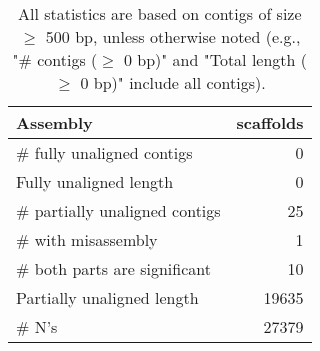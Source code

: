 \documentclass[12pt,a4paper]{article}
\begin{document}
\begin{table}[ht]
\begin{center}
\caption{All statistics are based on contigs of size $\geq$ 500 bp, unless otherwise noted (e.g., "\# contigs ($\geq$ 0 bp)" and "Total length ($\geq$ 0 bp)" include all contigs).}
\begin{tabular}{|l*{1}{|r}|}
\hline
Assembly & scaffolds \\ \hline
\# fully unaligned contigs & 0 \\ \hline
Fully unaligned length & 0 \\ \hline
\# partially unaligned contigs & 25 \\ \hline
\hspace{5mm}\# with misassembly & 1 \\ \hline
\hspace{5mm}\# both parts are significant & 10 \\ \hline
Partially unaligned length & 19635 \\ \hline
\# N's & 27379 \\ \hline
\end{tabular}
\end{center}
\end{table}
\end{document}
